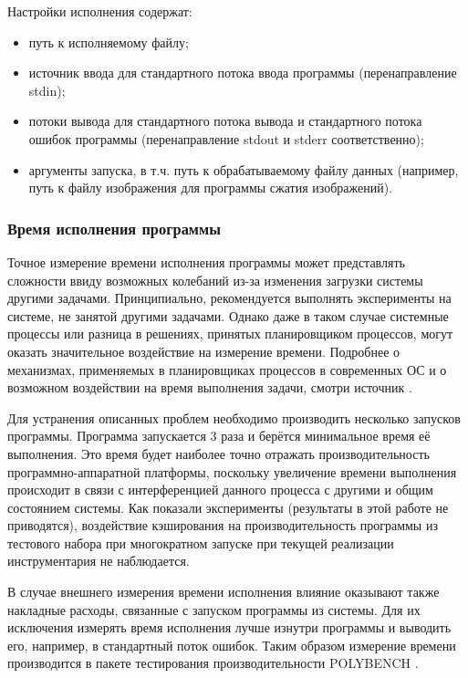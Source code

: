 \begin{samepage}
Настройки исполнения содержат:
\nopagebreak
\begin{itemize}
    \item путь к исполняемому файлу;
    \item источник ввода для стандартного потока ввода программы (перенаправление stdin);
    \item потоки вывода для стандартного потока вывода и стандартного потока ошибок программы (перенаправление stdout и stderr соответственно);
    \item аргументы запуска, в т.ч. путь к обрабатываемому файлу данных (например, путь к файлу изображения для программы сжатия изображений).
\end{itemize}
\end{samepage}


\subsubsection{Время исполнения программы}
Точное измерение времени исполнения программы может представлять сложности ввиду возможных колебаний из-за изменения загрузки системы другими задачами. Принципиально, рекомендуется выполнять эксперименты на системе, не занятой другими задачами. Однако даже в таком случае системные процессы или разница в решениях, принятых планировщиком процессов, могут оказать значительное воздействие на измерение времени. Подробнее о механизмах, применяемых в планировщиках процессов в современных ОС и о возможном воздействии на время выполнения задачи, смотри источник \cite{scheduling}.

Для устранения описанных проблем необходимо производить несколько запусков программы. Программа запускается 3 раза и берётся минимальное время её выполнения. Это время будет наиболее точно отражать производительность программно-аппаратной платформы, поскольку увеличение времени выполнения происходит в связи с интерференцией данного процесса с другими и общим состоянием системы. Как показали эксперименты (результаты в этой работе не приводятся), воздействие кэширования на производительность программы из тестового набора при многократном запуске при текущей реализации инструментария не наблюдается.

В случае внешнего измерения времени исполнения влияние оказывают также накладные расходы, связанные с запуском программы из системы. Для их исключения измерять время исполнения лучше изнутри программы и выводить его, например, в стандартный поток ошибок. Таким образом измерение времени производится в пакете тестирования производительности POLYBENCH \cite{polybench}.

